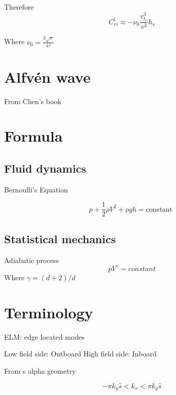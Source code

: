Therefore
\begin{equation}
C_{e i}^{l}\approx-\nu_0
 \frac{v_{t_{e}}^{3}}{v^{3}} h_s
\end{equation}

Where $\nu_0
=
\frac{3 \sqrt{\pi}}{4 \tau}
$

\section{Alfvén wave}

From Chen's book \cite{}

\section{Formula}

\subsection{Fluid dynamics}

Bernoulli's Equation

\begin{equation}
p+\frac{1}{2} \rho V^{2}+\rho g h=\text {constant }
\end{equation}

\subsection{Statistical mechanics}

Adiabatic process
\begin{equation}
    pV^{\gamma}=constant
\end{equation}
Where $\gamma=(d+2)/d$

\section{Terminology}

ELM: edge located modes

Low field side: Outboard
High field side: Inboard


From s alpha geometry

\begin{equation}
 -\pi k_y \hat{s} < k_x< \pi k_y \hat{s}
\end{equation}



